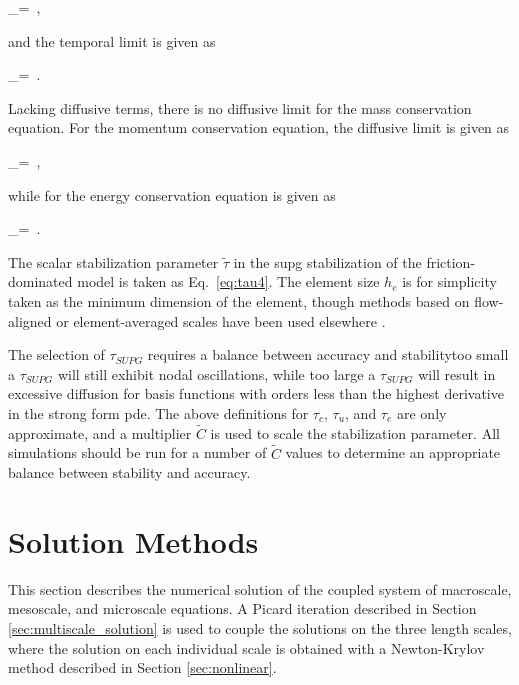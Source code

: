 \beq
\label{eq:tau1}
\tau_=\ ,
\eeq

\noindent and the temporal limit is given as

\beq
\label{eq:tau2}
\tau_=\ .
\eeq

\noindent Lacking diffusive terms, there is no diffusive limit for the mass conservation equation. For the momentum conservation equation, the diffusive limit is given as

\beq
\label{eq:tau3}
\tau_=\ ,
\eeq

\noindent while for the energy conservation equation is given as

\beq
\label{eq:tau4}
\tau_=\ .
\eeq

\noindent The scalar stabilization parameter \(\tilde{\tau}\) in the \gls{supg} stabilization of the friction-dominated model is taken as Eq.\ \eqref{eq:tau4}. The element size \(h_e\) is for simplicity taken as the minimum dimension of the element, though methods based on flow-aligned or element-averaged scales have been used elsewhere \cite{hauke_1998,hauke,tezduyar1983,tezduyar}. 

The selection of \(\tau_{SUPG}\) requires a balance between accuracy and stability\mdash too small a \(\tau_{SUPG}\) will still exhibit nodal oscillations, while too large a \(\tau_{SUPG}\) will result in excessive diffusion for basis functions with orders less than the highest derivative in the strong form \gls{pde}. The above definitions for \(\tau_c\), \(\tau_u\), and \(\tau_e\) are only approximate, and a multiplier \(\tilde{C}\) is used to scale the stabilization parameter. All simulations should be run for a number of \(\tilde{C}\) values to determine an appropriate balance between stability and accuracy. \

\section{Solution Methods}
\label{sec:solution}
This section describes the numerical solution of the coupled system of macroscale, mesoscale, and microscale equations. A Picard iteration described in Section \ref{sec:multiscale_solution} is used to couple the solutions on the three length scales, where the solution on each individual scale is obtained with a Newton-Krylov method described in Section \ref{sec:nonlinear}.


